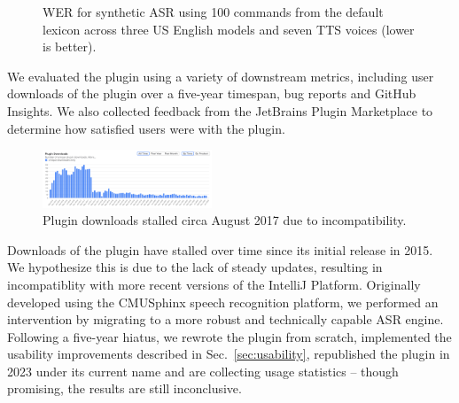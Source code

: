 \documentclass[conference]{IEEEtran}
\begin{document}
\begin{figure}[ht!]
  \centering
  \begin{table}
  \end{table}
  \caption{WER for synthetic ASR using 100 commands from the default lexicon across three US English models and seven TTS voices (lower is better).}
  \label{fig:fig1}
\end{figure}

We evaluated the plugin using a variety of downstream metrics, including user downloads of the plugin over a five-year timespan, bug reports and GitHub Insights. We also collected feedback from the JetBrains Plugin Marketplace to determine how satisfied users were with the plugin.

\begin{figure}[ht!]
  \centering
\includegraphics[width=0.45\textwidth]{downloads.png}
  \caption{Plugin downloads stalled circa August 2017 due to incompatibility.}
\end{figure}

Downloads of the plugin have stalled over time since its initial release in 2015. We hypothesize this is due to the lack of steady updates, resulting in incompatiblity with more recent versions of the IntelliJ Platform. Originally developed using the CMUSphinx speech recognition platform, we performed an intervention by migrating to a more robust and technically capable ASR engine. Following a five-year hiatus, we rewrote the plugin from scratch, implemented the usability improvements described in Sec.~\ref{sec:usability}, republished the plugin in 2023 under its current name and are collecting usage statistics -- though promising, the results are still inconclusive.
\end{document}
